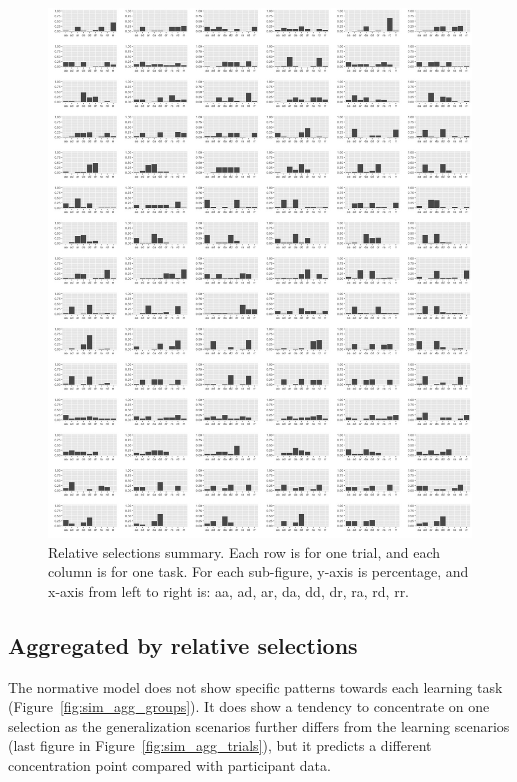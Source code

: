 \documentclass{article}
\begin{document}
\begin{figure}[h!]
  \centering
  \includegraphics[width=.8\linewidth]{sim_trials_relative}
  \caption{Relative selections summary. Each row is for one trial, and each column is for one task. For each sub-figure, y-axis is percentage, and x-axis from left to right is: aa, ad, ar, da, dd, dr, ra, rd, rr.}
\end{figure}

\clearpage

\subsection{Aggregated by relative selections}

The normative model does not show specific patterns towards each learning task (Figure~\ref{fig:sim_agg_groups}). It does show a tendency to concentrate on one selection as the generalization scenarios further differs from the learning scenarios (last figure in Figure~\ref{fig:sim_agg_trials}), but it predicts a different concentration point compared with participant data.
\end{document}
